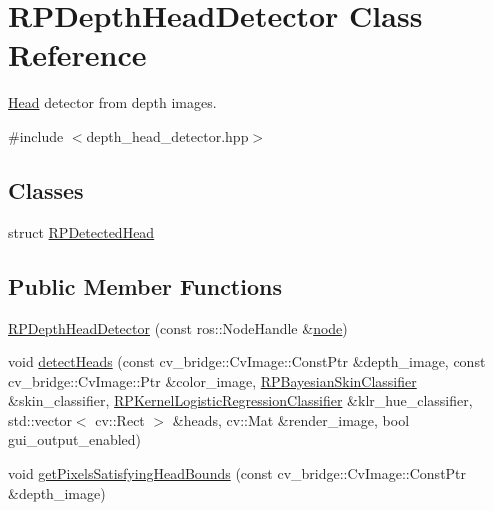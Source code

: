 \hypertarget{class_r_p_depth_head_detector}{\section{\-R\-P\-Depth\-Head\-Detector \-Class \-Reference}
\label{class_r_p_depth_head_detector}
}


\hyperlink{struct_head}{\-Head} detector from depth images.  




{\ttfamily \#include $<$depth\-\_\-head\-\_\-detector.\-hpp$>$}

\subsection*{\-Classes}
\begin{DoxyCompactItemize}
\item 
struct \hyperlink{struct_r_p_depth_head_detector_1_1_r_p_detected_head}{\-R\-P\-Detected\-Head}
\end{DoxyCompactItemize}
\subsection*{\-Public \-Member \-Functions}
\begin{DoxyCompactItemize}
\item 
\hyperlink{class_r_p_depth_head_detector_a7c975c2c80ca9bbf35f79957dc492075}{\-R\-P\-Depth\-Head\-Detector} (const ros\-::\-Node\-Handle \&\hyperlink{class_r_p_depth_head_detector_a53fd04b35998c8b45ca766ea2d3235c3}{node})
\item 
void \hyperlink{class_r_p_depth_head_detector_ad34a3f19133add261f04ad730a601deb}{detect\-Heads} (const cv\-\_\-bridge\-::\-Cv\-Image\-::\-Const\-Ptr \&depth\-\_\-image, const cv\-\_\-bridge\-::\-Cv\-Image\-::\-Ptr \&color\-\_\-image, \hyperlink{class_r_p_bayesian_skin_classifier}{\-R\-P\-Bayesian\-Skin\-Classifier} \&skin\-\_\-classifier, \hyperlink{class_r_p_kernel_logistic_regression_classifier}{\-R\-P\-Kernel\-Logistic\-Regression\-Classifier} \&klr\-\_\-hue\-\_\-classifier, std\-::vector$<$ cv\-::\-Rect $>$ \&heads, cv\-::\-Mat \&render\-\_\-image, bool gui\-\_\-output\-\_\-enabled)
\item 
void \hyperlink{class_r_p_depth_head_detector_a4c61c7e303d4d71f3eeeec65052013a6}{get\-Pixels\-Satisfying\-Head\-Bounds} (const cv\-\_\-bridge\-::\-Cv\-Image\-::\-Const\-Ptr \&depth\-\_\-image)
\end{DoxyCompactItemize}
